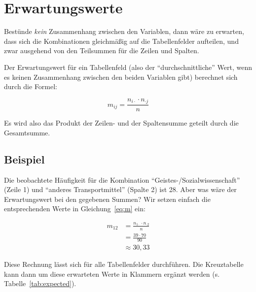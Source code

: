 \documentclass[
  11pt,
  ngerman,
  a4paper,
]{report}
\begin{document}
\hypertarget{erwartungswerte}{%
\section{Erwartungswerte}\label{erwartungswerte}}

Bestünde \emph{kein} Zusammenhang zwischen den Variablen, dann wäre zu erwarten, dass sich die Kombinationen gleichmäßig auf die Tabellenfelder aufteilen, und zwar ausgehend von den Teilsummen für die Zeilen und Spalten.

Der Erwartungswert für ein Tabellenfeld (also der \enquote{durchschnittliche} Wert, wenn es keinen Zusammenhang zwischen den beiden Variablen gibt) berechnet sich durch die Formel:

\nopagebreak

\[
m_{ij}=\frac{n_{i\cdot}\cdot n_{\cdot j}}{n}
\label{eq:m}
\]

Es wird also das Produkt der Zeilen- und der Spaltensumme geteilt durch die Gesamtsumme.

\hypertarget{beispiel-31}{%
\subsection{Beispiel}\label{beispiel-31}}

Die beobachtete Häufigkeit für die Kombination \enquote{Geistes-/Sozialwissenschaft} (Zeile 1) und \enquote{anderes Transportmittel} (Spalte 2) ist 28. Aber was wäre der Erwartungswert bei den gegebenen Summen? Wir setzen einfach die entsprechenden Werte in Gleichung~\eqref{eq:m} ein:

\nopagebreak

\[
\begin{aligned}
m_{12}&=\frac{n_{1\cdot}\cdot n_{\cdot 2}}{n}\\[5pt]
&=\frac{39\cdot 70}{90}\\[4pt]
&\approx 30{,}33
\end{aligned}
\]

Diese Rechnung lässt sich für alle Tabellenfelder durchführen. Die Kreuztabelle kann dann um diese erwarteten Werte in Klammern ergänzt werden (s. Tabelle~\ref{tab:expected}).
\end{document}
